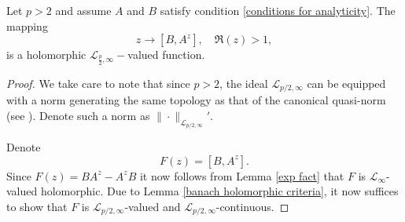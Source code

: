     \begin{lem}\label{psacta lemma} 
        Let $p>2$ and assume $A$ and $B$ satisfy condition \ref{conditions for analyticity}. The mapping
        $$z\to [B,A^z],\quad\Re(z)>1,$$
        is a holomorphic $\mathcal{L}_{\frac{p}{2},\infty}-$valued function.
    \end{lem}
    \begin{proof}
        We take care to note that since $p > 2$, the ideal $\mathcal{L}_{p/2,\infty}$ can be equipped with a norm generating the same topology as
        that of the canonical quasi-norm (see \cite[Chapter 4, Lemma 4.5]{Bennet-Sharpley-interpolation-1988}). Denote such a norm as $\|\cdot\|_{\mathcal{L}_{p/2,\infty}}'$.
        
        Denote 
        \begin{equation*}
            F(z) = [B,A^z].
        \end{equation*}
        Since $F(z) = BA^z-A^zB$ it now follows from Lemma \ref{exp fact} that $F$ is $\mathcal{L}_\infty$-valued holomorphic.
        Due to Lemma \ref{banach holomorphic criteria}, it now suffices to show that $F$ is $\mathcal{L}_{p/2,\infty}$-valued
        and $\mathcal{L}_{p/2,\infty}$-continuous.
        

\end{proof}
